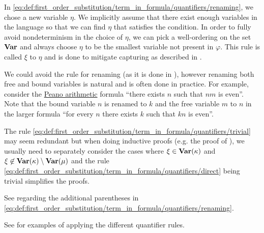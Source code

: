 \begin{definition}
\begin{thmenum}
    In \eqref{eq:def:first_order_substitution/term_in_formula/quantifiers/renaming}, we chose a new variable \( \eta \). We implicitly assume that there exist enough variables in the language so that we can find \( \eta \) that satisfies the condition. In order to fully avoid nondeterminism in the choice of \( \eta \), we can pick a well-ordering on the set \( \operatorname{\mathbf{Var}} \) and always choose \( \eta \) to be the smallest variable not present in \( \varphi \). This rule is called  \( \xi \) to \( \eta \) and is done to mitigate capturing as described in .

    We could avoid the rule for renaming (as it is done in \cite[def. 15.25]{OpenLogicFull}), however renaming both free and bound variables is natural and is often done in practice. For example, consider the \hyperref[def:peano_arithmetic]{Peano arithmetic} formula \enquote{there exists \( n \) such that \( nm \) is even}. Note that the bound variable \( n \) is renamed to \( k \) and the free variable \( m \) to \( n \) in the larger formula \enquote{for every \( n \) there exists \( k \) such that \( kn \) is even}.

    The rule \eqref{eq:def:first_order_substitution/term_in_formula/quantifiers/trivial} may seem redundant but when doing inductive proofs (e.g. the proof of ), we usually need to separately consider the cases where \( \xi \in \operatorname{\mathbf{Var}}(\kappa) \) and \( \xi \not\in \operatorname{\mathbf{Var}}(\kappa) \setminus \operatorname{\mathbf{Var}}(\mu) \) and the rule \eqref{eq:def:first_order_substitution/term_in_formula/quantifiers/direct} being trivial simplifies the proofs.

    See  regarding the additional parentheses in \eqref{eq:def:first_order_substitution/term_in_formula/quantifiers/renaming}.

    See  for examples of applying the different quantifier rules.
  \end{thmenum}
\end{definition}

